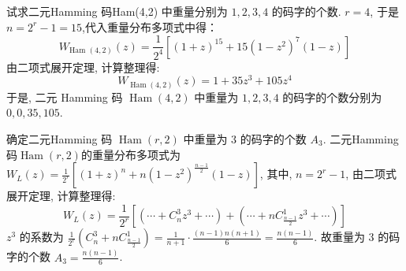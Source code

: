   \begin{tcolorbox}[breakable,colback=blue!5!white,colframe=blue!75!black,
 title= 解答题]
 
试求二元Hamming 码Ham(4,2) 中重量分别为 $ 1,2,3,4 $ 的码字的个数.
 \tcblower
$r=4$, 于是$n=2^r-1=15$,代入重量分布多项式中得：
$$
W_{\text {Ham }(4,2)}(z)=\frac{1}{2^{4}}\left[(1+z)^{15}+15\left(1-z^{2}\right)^{7}(1-z)\right]
$$
由二项式展开定理, 计算整理得:
$$
W_{\operatorname{Ham}(4,2)}(z)=1+35 z^{3}+105 z^{4}
$$
于是, 二元 Hamming 码 $ \operatorname{Ham}(4,2) $ 中重量为 $ 1,2,3,4 $ 的码字的个数分别为 $ 0,0,35,105 $.
 \end{tcolorbox}


\begin{tcolorbox}[breakable,colback=blue!5!white,colframe=blue!75!black,
 title= 解答题]
 
确定二元Hamming 码 $ \operatorname{Ham}(r, 2) $ 中重量为 3 的码字的个数 $ A_{3} $.
 \tcblower
 二元Hamming 码$ \operatorname{Ham}(r, 2) $的重量分布多项式为
 $ W_{L}(z)=\frac{1}{2^{r}}\left[(1+z)^{n}+n\left(1-z^{2}\right)^{\frac{n-1}{2}}(1-z)\right] $, 其中, $ n=2^{r}-1 $, 由二项式展开定理, 计算整理得:
$$
W_{L}(z)=\frac{1}{2^{r}}\left[\left(\cdots+C_{n}^{3} z^{3}+\cdots\right)+(\cdots+n C_{\frac{n-1}{2}}^{1} z^{3}+\cdots)\right]
$$
$ z^{3} $ 的系数为 $ \frac{1}{2^{r}}\left(C_{n}^{3}+n C_{\frac{n-1}{2}}^{1}\right)=\frac{1}{n+1}\cdot\frac{(n-1)n(n+1)}{6}=\frac{n(n-1)}{6} $. 故重量为 3 的码字的个数 $ A_{3}=\frac{n(n-1)}{6} $.
 \end{tcolorbox}


 